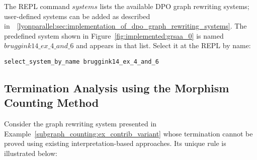 The REPL command \colorbox{Ivory2}{$systems$} lists the available DPO graph rewriting systems; user-defined systems can be added as described in~\textsection~\ref{lyonparallel:sec:implementation_of_dpo_graph_rewriting_systems}. The predefined system shown in Figure~\ref{fig:implemented:grsaa_0} is named \colorbox{Ivory2}{$bruggink14\_ex\_4\_and\_6$} and appears in that list. Select it at the REPL by name:
\begin{verbatim}
select_system_by_name bruggink14_ex_4_and_6
\end{verbatim}


\subsection{Termination Analysis using the Morphism Counting Method}
Consider the graph rewriting system presented in Example~\ref{subgraph_counting:ex_contrib_variant} whose termination cannot be proved using existing interpretation-based approaches. Its unique rule is illustrated below:
